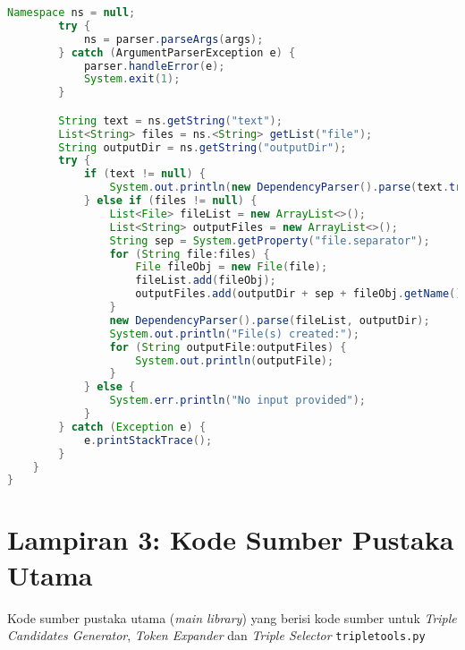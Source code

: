 \begin{lstlisting}[language=Java]
        Namespace ns = null;
        try {
            ns = parser.parseArgs(args);
        } catch (ArgumentParserException e) {
            parser.handleError(e);
            System.exit(1);
        }

        String text = ns.getString("text");
        List<String> files = ns.<String> getList("file");
        String outputDir = ns.getString("outputDir");
        try {
            if (text != null) {
                System.out.println(new DependencyParser().parse(text.trim()));
            } else if (files != null) {
                List<File> fileList = new ArrayList<>();
                List<String> outputFiles = new ArrayList<>();
                String sep = System.getProperty("file.separator");
                for (String file:files) {
                    File fileObj = new File(file);
                    fileList.add(fileObj);
                    outputFiles.add(outputDir + sep + fileObj.getName() + "." + OUTPUT_FORMAT);
                }
                new DependencyParser().parse(fileList, outputDir);
                System.out.println("File(s) created:");
                for (String outputFile:outputFiles) {
                    System.out.println(outputFile);
                }
            } else {
                System.err.println("No input provided");
            }
        } catch (Exception e) {
            e.printStackTrace();
        }
    }
}
\end{lstlisting}



\chapter*{Lampiran 3: Kode Sumber Pustaka Utama}

Kode sumber pustaka utama (\textit{main library}) yang berisi kode sumber untuk \textit{Triple Candidates Generator}, \textit{Token Expander} dan \textit{Triple Selector} \verb|tripletools.py|

